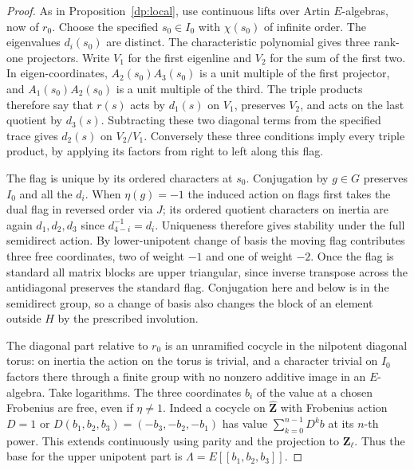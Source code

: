 \begin{proof}
As in Proposition~\ref{dp:local}, use continuous lifts over Artin
\(E\)-algebras, now of \(r_0\). Choose the specified
\(s_0\in I_0\) with \(\chi(s_0)\) of infinite order.
The eigenvalues \(d_i(s_0)\) are distinct. The characteristic
polynomial gives three rank-one projectors. Write \(V_1\) for the
first eigenline and \(V_2\) for the sum of the first two.
In eigen-coordinates, \(A_2(s_0)A_3(s_0)\) is a unit multiple of
the first projector, and \(A_1(s_0)A_2(s_0)\) is a unit multiple
of the third. The triple products therefore say that \(r(s)\) acts by
\(d_1(s)\) on \(V_1\), preserves \(V_2\), and acts on the last
quotient by \(d_3(s)\). Subtracting these two diagonal terms from
the specified trace gives \(d_2(s)\) on \(V_2/V_1\). Conversely
these three conditions imply every triple product, by applying its
factors from right to left along this flag.

The flag is unique by its ordered characters at \(s_0\). Conjugation
by \(g\in G\) preserves \(I_0\) and all the \(d_i\). When
\(\eta(g)=-1\) the induced action on flags first takes the dual flag
in reversed order via \(J\); its ordered quotient characters on
inertia are again \(d_1,d_2,d_3\) since \(d_{4-i}^{-1}=d_i\).
Uniqueness therefore gives stability under the full semidirect
action. By lower-unipotent change of basis the moving flag contributes
three free coordinates, two of weight \(-1\) and one of weight
\(-2\). Once the flag is standard all matrix blocks are upper
triangular, since inverse transpose across the antidiagonal preserves
the standard flag. Conjugation here and below is in the semidirect
group, so a change of basis also changes the block of an element
outside \(H\) by the prescribed involution.

The diagonal part relative to \(r_0\) is an unramified cocycle in
the nilpotent diagonal torus: on inertia the action on the torus
is trivial, and a character trivial on \(I_0\) factors there
through a finite group with no nonzero additive image in an
\(E\)-algebra. Take logarithms. The three coordinates \(b_i\) of
the value at a chosen Frobenius are free, even if \(\eta\ne1\).
Indeed a cocycle on \(\widehat{\mathbf Z}\) with Frobenius action
\(D=1\) or \(D(b_1,b_2,b_3)=(-b_3,-b_2,-b_1)\) has value
\(\sum_{k=0}^{n-1}D^kb\) at its \(n\)-th power. This extends
continuously using parity and the projection to \(\mathbf Z_\ell\).
Thus the base for the upper unipotent part is
\(\Lambda=E[[b_1,b_2,b_3]]\).


\end{proof}
